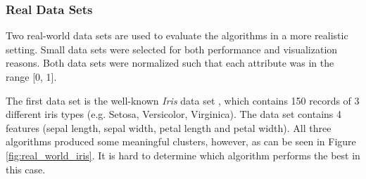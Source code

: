 
\subsubsection{Real Data Sets}
Two real-world data sets are used to evaluate the algorithms in a more realistic setting. Small data sets were selected for both performance and visualization reasons. Both data sets were normalized such that each attribute was in the range [0, 1].

The first data set is the well-known \textit{Iris} data set \cite{iris}, which contains 150 records of 3 different iris types (e.g. Setosa, Versicolor, Virginica). The data set contains 4 features (sepal length, sepal width, petal length and petal width). All three algorithms produced some meaningful clusters, however, as can be seen in Figure \ref{fig:real_world_iris}. It is hard to determine which algorithm performs the best in this case.

